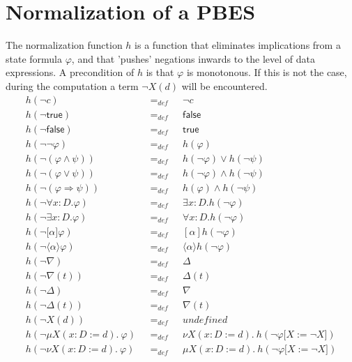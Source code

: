 \documentclass{article}
\begin{document}
\newpage

\section{Normalization of a PBES}

The normalization function $h$ is a function that eliminates implications
from a state formula $\varphi $, and that 'pushes' negations inwards to the
level of data expressions. A precondition of $h$ is that $\varphi $ is
monotonous. If this is not the case, during the computation a term $\lnot
X(d)$ will be encountered.%
\begin{equation*}
\begin{array}{lll}
h(\lnot c) & =_{def} & \lnot c \\
h(\lnot \mathsf{true}) & =_{def} & \mathsf{false} \\
h(\lnot \mathsf{false}) & =_{def} & \mathsf{true} \\
h(\lnot \lnot \varphi ) & =_{def} & h(\varphi ) \\
h(\lnot (\varphi \wedge \psi )) & =_{def} & h(\lnot \varphi )\vee h(\lnot
\psi ) \\
h(\lnot (\varphi \vee \psi )) & =_{def} & h(\lnot \varphi )\wedge h(\lnot
\psi ) \\
h(\lnot (\varphi \Rightarrow \psi )) & =_{def} & h(\varphi )\wedge h(\lnot
\psi ) \\
h(\lnot \forall {x{:}D}.\varphi ) & =_{def} & \exists {x{:}D}.h(\lnot
\varphi ) \\
h(\lnot \exists {x{:}D}.\varphi ) & =_{def} & \forall {x{:}D}.h(\lnot
\varphi ) \\
h(\lnot \lbrack \alpha ]\varphi ) & =_{def} & [\alpha ]h(\lnot \varphi ) \\
h(\lnot \langle \alpha \rangle \varphi ) & =_{def} & \langle \alpha \rangle
h(\lnot \varphi ) \\
h(\lnot \nabla ) & =_{def} & \Delta \\
h(\lnot \nabla (t)) & =_{def} & \Delta (t) \\
h(\lnot \Delta ) & =_{def} & \nabla \\
h(\lnot \Delta (t)) & =_{def} & \nabla (t) \\
h(\lnot X(d)) & =_{def} & undefined \\
h(\lnot \mu X(x{:}D:=d).~\varphi )~~~ & =_{def}~~~ & \nu X(x{:}%
D:=d).~h(\lnot \varphi \lbrack X:=\lnot X]) \\
h(\lnot \nu X(x{:}D:=d).~\varphi )~~~ & =_{def}~~~ & \mu X(x{:}%
D:=d).~h(\lnot \varphi \lbrack X:=\lnot X]) \\

\end{array}
\end{equation*}
\end{document}
